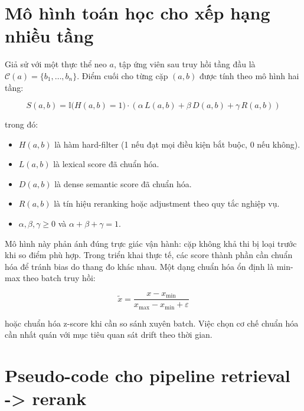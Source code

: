 \section{Mô hình toán học cho xếp hạng nhiều tầng}

Giả sử với một thực thể neo $a$, tập ứng viên sau truy hồi tầng đầu là $\mathcal{C}(a)=\{b_1,\dots,b_n\}$. Điểm cuối cho từng cặp $(a,b)$ được tính theo mô hình hai tầng:

\begin{equation}
S(a,b)=\mathbb{I}\big(H(a,b)=1\big)\cdot \left(\alpha\,L(a,b)+\beta\,D(a,b)+\gamma\,R(a,b)\right)
\end{equation}

trong đó:

\begin{itemize}
  \item $H(a,b)$ là hàm hard-filter (1 nếu đạt mọi điều kiện bắt buộc, 0 nếu không).
  \item $L(a,b)$ là lexical score đã chuẩn hóa.
  \item $D(a,b)$ là dense semantic score đã chuẩn hóa.
  \item $R(a,b)$ là tín hiệu reranking hoặc adjustment theo quy tắc nghiệp vụ.
  \item $\alpha,\beta,\gamma\ge0$ và $\alpha+\beta+\gamma=1$.
\end{itemize}

Mô hình này phản ánh đúng trực giác vận hành: cặp không khả thi bị loại trước khi so điểm phù hợp. Trong triển khai thực tế, các score thành phần cần chuẩn hóa để tránh bias do thang đo khác nhau. Một dạng chuẩn hóa ổn định là min-max theo batch truy hồi:

\begin{equation}
\tilde{x}=\frac{x-x_{\min}}{x_{\max}-x_{\min}+\varepsilon}
\end{equation}

hoặc chuẩn hóa z-score khi cần so sánh xuyên batch. Việc chọn cơ chế chuẩn hóa cần nhất quán với mục tiêu quan sát drift theo thời gian.

\section{Pseudo-code cho pipeline retrieval -> rerank}

